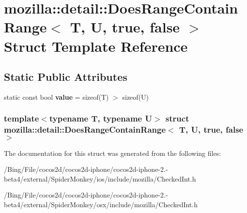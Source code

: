 \hypertarget{structmozilla_1_1detail_1_1_does_range_contain_range_3_01_t_00_01_u_00_01true_00_01false_01_4}{\section{mozilla\-:\-:detail\-:\-:Does\-Range\-Contain\-Range$<$ T, U, true, false $>$ Struct Template Reference}
\label{structmozilla_1_1detail_1_1_does_range_contain_range_3_01_t_00_01_u_00_01true_00_01false_01_4}
}
\subsection*{Static Public Attributes}
\begin{DoxyCompactItemize}
\item 
\hypertarget{structmozilla_1_1detail_1_1_does_range_contain_range_3_01_t_00_01_u_00_01true_00_01false_01_4_a3ef67d23b0f0a06230cedbbbd56a5e2a}{static const bool {\bfseries value} = sizeof(T) $>$ sizeof(U)}\label{structmozilla_1_1detail_1_1_does_range_contain_range_3_01_t_00_01_u_00_01true_00_01false_01_4_a3ef67d23b0f0a06230cedbbbd56a5e2a}

\end{DoxyCompactItemize}
\subsubsection*{template$<$typename T, typename U$>$ struct mozilla\-::detail\-::\-Does\-Range\-Contain\-Range$<$ T, U, true, false $>$}



The documentation for this struct was generated from the following files\-:\begin{DoxyCompactItemize}
\item 
/\-Bing/\-File/cocos2d/cocos2d-\/iphone/cocos2d-\/iphone-\/2.-\/beta4/external/\-Spider\-Monkey/ios/include/mozilla/Checked\-Int.\-h\item 
/\-Bing/\-File/cocos2d/cocos2d-\/iphone/cocos2d-\/iphone-\/2.-\/beta4/external/\-Spider\-Monkey/osx/include/mozilla/Checked\-Int.\-h\end{DoxyCompactItemize}
